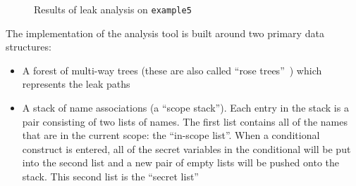 \documentclass[10pt, conference]{IEEEtran}
\newcommand{\ttt}{\texttt}
\begin{document}
\begin{figure}
\centering
\caption{Results of leak analysis on \ttt{example5}}
\label{fig:Analysis5}
\end{figure}

The implementation of the analysis tool is built around two primary data
structures:

\begin{itemize}
  \item
    A forest of multi-way trees (these are also called ``rose
trees''~\cite{LooplessBird}) which represents the leak paths
  \item
    A stack of name associations (a ``scope stack''). Each entry in the stack is
    a pair consisting of two lists of names. The first list contains all of the
    names that are in the current scope: the ``in-scope list''. When a
    conditional construct is entered, all of the secret variables in the
    conditional will be put into the second list and a new pair of empty lists
    will be pushed onto the stack. This second list is the ``secret list''
\end{itemize}
\end{document}
